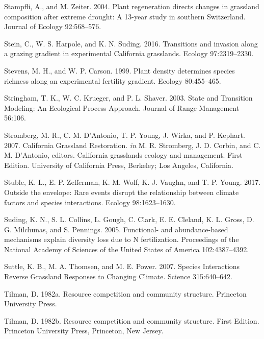 \documentclass[twoside,12pt,final]{ucthesis-CA2012}
\newlength{\cslhangindent}
\newenvironment{cslreferences}%
  {\setlength{\parindent}{0pt}%
  \everypar{\setlength{\hangindent}{\cslhangindent}}\ignorespaces}%
  {\par}
\begin{document}
\begin{ucmainmatter}
\begin{cslreferences}
\leavevmode\hypertarget{ref-Stampfli2004}{}%
Stampfli, A., and M. Zeiter. 2004. Plant regeneration directs changes in grassland composition after extreme drought: A 13-year study in southern Switzerland. Journal of Ecology 92:568--576.

\leavevmode\hypertarget{ref-Stein2016}{}%
Stein, C., W. S. Harpole, and K. N. Suding. 2016. Transitions and invasion along a grazing gradient in experimental California grasslands. Ecology 97:2319--2330.

\leavevmode\hypertarget{ref-stevens1999}{}%
Stevens, M. H., and W. P. Carson. 1999. Plant density determines species richness along an experimental fertility gradient. Ecology 80:455--465.

\leavevmode\hypertarget{ref-Stringham2003}{}%
Stringham, T. K., W. C. Krueger, and P. L. Shaver. 2003. State and Transition Modeling: An Ecological Process Approach. Journal of Range Management 56:106.

\leavevmode\hypertarget{ref-Stromberg2007}{}%
Stromberg, M. R., C. M. D'Antonio, T. P. Young, J. Wirka, and P. Kephart. 2007. California Grassland Restoration. \emph{in} M. R. Stromberg, J. D. Corbin, and C. M. D'Antonio, editors. California grasslands ecology and management. First Edition. University of California Press, Berkeley; Los Angeles, California.

\leavevmode\hypertarget{ref-Stuble2017}{}%
Stuble, K. L., E. P. Zefferman, K. M. Wolf, K. J. Vaughn, and T. P. Young. 2017. Outside the envelope: Rare events disrupt the relationship between climate factors and species interactions. Ecology 98:1623--1630.

\leavevmode\hypertarget{ref-Suding2005}{}%
Suding, K. N., S. L. Collins, L. Gough, C. Clark, E. E. Cleland, K. L. Gross, D. G. Milchunas, and S. Pennings. 2005. Functional- and abundance-based mechanisms explain diversity loss due to N fertilization. Proceedings of the National Academy of Sciences of the United States of America 102:4387--4392.

\leavevmode\hypertarget{ref-Suttle2007}{}%
Suttle, K. B., M. A. Thomsen, and M. E. Power. 2007. Species Interactions Reverse Grassland Responses to Changing Climate. Science 315:640--642.

\leavevmode\hypertarget{ref-tilman1982resource}{}%
Tilman, D. 1982a. Resource competition and community structure. Princeton University Press.

\leavevmode\hypertarget{ref-Tilman1982}{}%
Tilman, D. 1982b. Resource competition and community structure. First Edition. Princeton University Press, Princeton, New Jersey.


\end{cslreferences}
\end{ucmainmatter}
\end{document}
